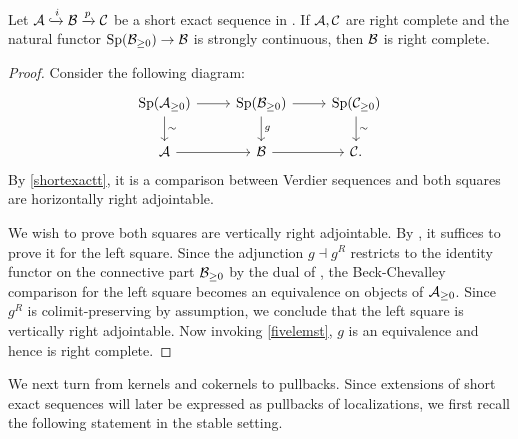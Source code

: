 \documentclass[a4paper,10pt, oneside]{amsart}
\begin{document}
	\begin{prop}\label{fivelemrightcompl}
		Let $\mathcal{A}\xhookrightarrow{i}\mathcal{B}\xrightarrow{p}\mathcal{C}$ be a short exact sequence in \prtil. If $\mathcal{A},\mathcal{C}$ are right complete and the natural functor $\mathrm{Sp}(\mathcal{B}_{\geq0})\to\mathcal{B}$ is strongly continuous, then $\mathcal{B}$ is right complete.
	\end{prop}
	\begin{proof}
		Consider the following diagram:
		$$\begin{tikzcd}
			\opsp(\mca_{\geq0}) \arrow[d, "\sim"] \arrow[r] & \opsp(\mcb_{\geq0}) \arrow[d,"g"] \arrow[r] & \opsp(\mcc_{\geq0}) \arrow[d, "\sim"] \\
			\mca \arrow[r]                                  & \mcb \arrow[r]                        & \mcc.
		\end{tikzcd}$$
		By \cref{shortexactt}, it is a comparison between Verdier sequences and both squares are horizontally right adjointable. 
		
		We wish to prove both squares are vertically right adjointable. 
		By \cite[Proposition A.16]{ramzi2024dualizable}, it suffices to prove it for the left square. Since the 
		adjunction $g\dashv g^R$  restricts to the identity functor on the connective part $\mathcal{B}_{\geq0}$ by the 
		dual of \cite[Proposition 1.2.1.17]{ha}, the Beck-Chevalley comparison for the left square becomes an 
		equivalence on objects of $\mathcal{A}_{\geq0}$. 
		 Since $g^R$ is colimit-preserving by assumption, we conclude that the left square is vertically right adjointable.
		Now invoking \cref{fivelemst}, $g$ is an equivalence and hence \mcb is right complete.
	\end{proof}
	
	We next turn from kernels and cokernels to pullbacks. Since extensions of short exact sequences will later be expressed as pullbacks of localizations, we first recall the following  statement in the stable setting.
	
\end{document}
